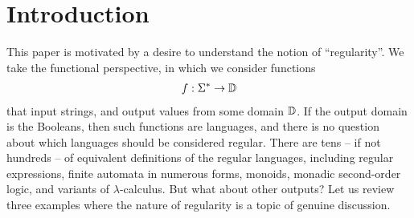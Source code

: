 \section{Introduction}
\label{sec:introduction}
This paper is motivated by a desire to understand the notion of  ``regularity''. We take the functional perspective, in which we consider functions 
\begin{align*}
f : \Sigma^* \to \mathbb D
\end{align*}
that input strings, and output values from some domain $\mathbb D$. 
If the output domain is the Booleans, then such functions
are languages, and there is no question about which languages should be considered regular. There are tens -- if not hundreds -- of equivalent definitions of the regular languages, including regular expressions, finite automata in numerous forms, monoids, monadic second-order logic, and variants of $\lambda$-calculus. But what about other outputs? Let us review three examples where the nature of regularity is a topic of genuine  discussion.

